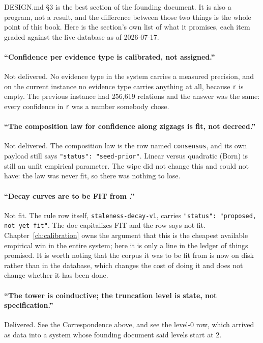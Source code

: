 DESIGN.md \S3 is the best section of the founding document. It is also a program, not a result, and the difference between those two things is the whole point of this book. Here is the section's own list of what it promises, each item graded against the live database as of 2026-07-17.

\paragraph{``Confidence per evidence type is calibrated, not assigned.''} Not delivered. No evidence type in the system carries a measured precision, and on the current instance no evidence type carries anything at all, because \texttt{r} is empty. The previous instance had 256,619 relations and the answer was the same: every confidence in \texttt{r} was a number somebody chose.

\paragraph{``The composition law for confidence along zigzags is fit, not decreed.''} Not delivered. The composition law is the row named \texttt{consensus}, and its own payload still says \texttt{"status": "seed-prior"}. Linear versus quadratic (Born) is still an unfit empirical parameter. The wipe did not change this and could not have: the law was never fit, so there was nothing to lose.

\paragraph{``Decay curves are to be FIT from \labCorpus.''} Not fit. The rule row itself, \texttt{staleness-decay-v1}, carries \texttt{"status": "proposed, not yet fit"}. The doc capitalizes FIT and the row says not fit. Chapter~\ref{ch:calibration} owns the argument that this is the cheapest available empirical win in the entire system; here it is only a line in the ledger of things promised. It is worth noting that the corpus it was to be fit from is now on disk rather than in the database, which changes the cost of doing it and does not change whether it has been done.

\paragraph{``The tower is coinductive; the truncation level is state, not specification.''} Delivered. See the Correspondence above, and see the level-0 row, which arrived as data into a system whose founding document said levels start at 2.

